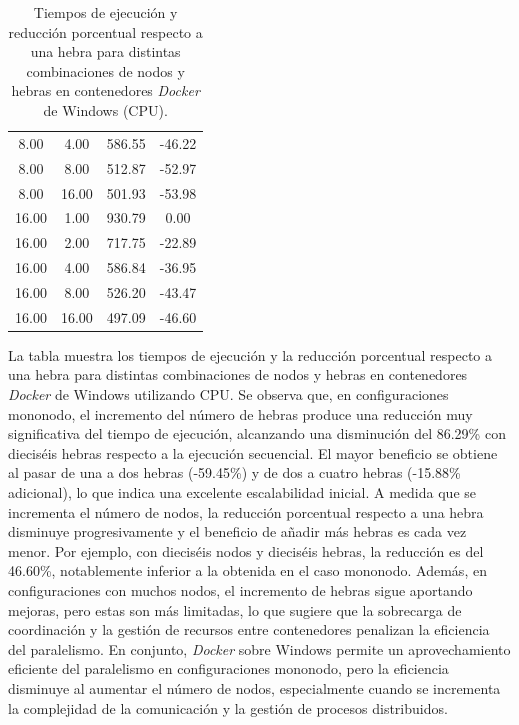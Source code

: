 \begin{table}[ht]
\begin{tabular}{|c|c|c|c|}
        8.00           & 4.00            & 586.55              & -46.22                         \\
        8.00           & 8.00            & 512.87              & -52.97                         \\
        8.00           & 16.00           & 501.93              & -53.98                         \\
        16.00          & 1.00            & 930.79              & 0.00                           \\
        16.00          & 2.00            & 717.75              & -22.89                         \\
        16.00          & 4.00            & 586.84              & -36.95                         \\
        16.00          & 8.00            & 526.20              & -43.47                         \\
        16.00          & 16.00           & 497.09              & -46.60                         \\
        \hline
    \end{tabular}
    \caption{Tiempos de ejecución y reducción porcentual respecto a una hebra para distintas combinaciones de nodos y hebras en contenedores \textit{Docker} de Windows (CPU).}
    \label{tab:thread_sweep_windows_\textit{Docker}_time}
\end{table}

La tabla muestra los tiempos de ejecución y la reducción porcentual respecto a una hebra para distintas combinaciones de nodos y hebras en contenedores \textit{Docker} de Windows utilizando CPU. Se observa que, en configuraciones mononodo, el incremento del número de hebras produce una reducción muy significativa del tiempo de ejecución, alcanzando una disminución del 86.29\% con dieciséis hebras respecto a la ejecución secuencial. El mayor beneficio se obtiene al pasar de una a dos hebras (-59.45\%) y de dos a cuatro hebras (-15.88\% adicional), lo que indica una excelente escalabilidad inicial. A medida que se incrementa el número de nodos, la reducción porcentual respecto a una hebra disminuye progresivamente y el beneficio de añadir más hebras es cada vez menor. Por ejemplo, con dieciséis nodos y dieciséis hebras, la reducción es del 46.60\%, notablemente inferior a la obtenida en el caso mononodo. Además, en configuraciones con muchos nodos, el incremento de hebras sigue aportando mejoras, pero estas son más limitadas, lo que sugiere que la sobrecarga de coordinación y la gestión de recursos entre contenedores penalizan la eficiencia del paralelismo. En conjunto, \textit{Docker} sobre Windows permite un aprovechamiento eficiente del paralelismo en configuraciones mononodo, pero la eficiencia disminuye al aumentar el número de nodos, especialmente cuando se incrementa la complejidad de la comunicación y la gestión de procesos distribuidos.

